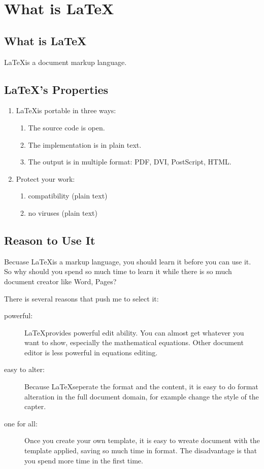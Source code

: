 \chapter{What is \LaTeX}

\section{What is \LaTeX}
\LaTeX is a document markup language.


\section{\LaTeX's Properties}


\begin{enumerate}
\item \LaTeX is portable in three ways:
  \begin{enumerate}
  \item The source code is open.
  \item The implementation is in plain text.
  \item The output is in multiple format: PDF, DVI, PostScript, HTML.
  \end{enumerate}
\item Protect your work:
  \begin{enumerate}
  \item compatibility (plain text)
  \item no viruses (plain text)
  \end{enumerate}
\end{enumerate}


\section{Reason to Use It}
Becuase \LaTeX is a markup language, you should learn it before you can use it.
So why should you spend so much time to learn it while there is so much document creator like Word, Pages?

There is several reasons that push me to select it:
\begin{description}
  \item[powerful:] \LaTeX provides powerful edit ability. You can almost get whatever you want to show, especially the mathematical equations. Other document editor is less powerful in equations editing.
  \item[easy to alter:] Because \LaTeX seperate the format and the content, it is easy to do format alteration in the full document domain, for example change the style of the capter.
  \item[one for all:] Once you create your own template, it is easy to wreate document with the template applied, saving so much time in format. The disadvantage is that you spend more time in the first time.
\end{description}

